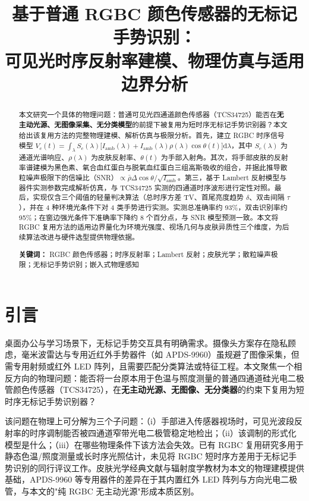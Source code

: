 \documentclass[11pt,a4paper]{ctexart}
\title{\textbf{基于普通 RGBC 颜色传感器的无标记手势识别：\\可见光时序反射率建模、物理仿真与适用边界分析}}
\author{}
\date{}
\begin{document}
\maketitle

\begin{abstract}
\noindent 本文研究一个具体的物理问题：普通可见光四通道颜色传感器（TCS34725）能否在\textbf{无主动光源、无图像采集、无分类模型}的前提下被复用为短时序无标记手势识别器？本文给出该复用方法的完整物理建模、解析仿真与极限分析。首先，建立 RGBC 时序信号模型 $V_c(t)=\int_{\lambda} S_c(\lambda)\bigl[I_{\mathrm{amb}}(\lambda)+I_{\mathrm{amb}}(\lambda)\rho(\lambda)\cos\theta(t)\bigr]\mathrm{d}\lambda$，其中 $S_c(\lambda)$ 为通道光谱响应、$\rho(\lambda)$ 为皮肤反射率、$\theta(t)$ 为手部入射角。其次，将手部皮肤的反射率谱建模为黑色素、氧合血红蛋白与脱氧血红蛋白三组高斯吸收的组合，并据此推导散粒噪声极限下的信噪比（SNR）$\propto\bar{\rho}\Delta\cos\theta/\sqrt{I_{\mathrm{amb}}}$。第三，基于 Lambert 反射模型与器件实测参数完成解析仿真，与 TCS34725 实测的四通道时序波形进行定性对照。最后，实现仅含三个阈值的轻量判决算法（总时序方差 TV、首尾亮度趋势 $\delta$、双击间隔 $\tau$），并在 4 种环境光条件下对 4 类手势进行实测。实测总准确率约 93\%，双击识别率约 95\%；在窗边强光条件下准确率下降约 8 个百分点，与 SNR 模型预测一致。本文将 RGBC 复用方法的适用边界量化为环境光强度、视场几何与皮肤异质性三个维度，为后续算法改进与硬件选型提供物理依据。

\vspace{0.5em}
\noindent\textbf{关键词：} RGBC 颜色传感器；时序反射率；Lambert 反射；皮肤光学；散粒噪声极限；无标记手势识别；嵌入式物理感知
\end{abstract}

\section{引言}
\label{sec:intro}

桌面办公与学习场景下，无标记手势交互具有明确需求。摄像头方案存在隐私顾虑\citep{padillalopez2015privacy}，毫米波雷达与专用近红外手势器件（如 APDS-9960）虽规避了图像采集，但需专用射频或红外 LED 阵列\citep{lien2016soli}，且需要匹配分类算法或特征工程\citep{rautaray2015vision}。本文聚焦一个相反方向的物理问题：能否将一台原本用于色温与照度测量的普通四通道硅光电二极管颜色传感器（TCS34725），在\textbf{无主动光源、无图像、无分类器}的约束下复用为短时序无标记手势识别器？

该问题在物理上可分解为三个子问题：（i）手部进入传感器视场时，可见光波段反射率的时序调制能否被四通道窄带光电二极管稳定地检出；（ii）该调制的形式化模型是什么；（iii）在哪些物理条件下该方法会失效。已有 RGBC 复用研究多用于静态色温/照度测量或长时序光照估计，未见将 RGBC 短时序方差用于无标记手势识别的同行评议工作。皮肤光学经典文献\citep{andersonparrish1981}与辐射度学教材\citep{bornwolf1999}为本文的物理建模提供基础，APDS-9960 等专用器件的差异在于其内置红外 LED 阵列与方向光电二极管，与本文的"纯 RGBC 无主动光源"形成本质区别。
\end{document}
